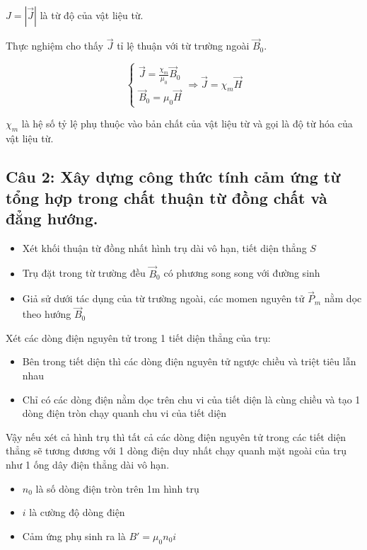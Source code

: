 $J = |\vec{J}|$ là từ độ của vật liệu từ.

Thực nghiệm cho thấy $\vec{J}$ tỉ lệ thuận với từ trường ngoài $\vec{B}_0$.

\begin{equation*}
  \begin{cases}
    \vec{J} = \frac{\chi_m}{\mu_0} \vec{B}_0 \\
    \vec{B}_0 = \mu_0 \vec{H}
  \end{cases}
  \Rightarrow \vec{J} = \chi_m \vec{H}
\end{equation*}

$\chi_m$ là hệ số tỷ lệ phụ thuộc vào bản chất của vật liệu từ và gọi là độ từ hóa của vật liệu từ.

\subsection[Câu 2]{Câu 2: Xây dựng công thức tính cảm ứng từ tổng hợp trong chất thuận từ đồng chất và đẳng hướng.}

\begin{itemize}
  \item Xét khối thuận từ đồng nhất hình trụ dài vô hạn, tiết diện thẳng $S$
  \item Trụ đặt trong từ trường đều $\vec{B}_0$ có phương song song với đường sinh
  \item Giả sử dưới tác dụng của từ trường ngoài, các momen nguyên tử $\vec{P}_m$ nằm dọc theo hướng $\vec{B}_0$
\end{itemize}

Xét các dòng điện nguyên tử trong 1 tiết diện thẳng của trụ:

\begin{itemize}
  \item Bên trong tiết diện thì các dòng điện nguyên tử ngược chiều và triệt tiêu lẫn nhau
  \item Chỉ có các dòng điện nằm dọc trên chu vi của tiết diện là cùng chiều và tạo 1 dòng điện tròn chạy quanh chu vi của tiết diện
\end{itemize}

Vậy nếu xét cả hình trụ thì tất cả các dòng điện nguyên tử trong các tiết diện thẳng sẽ tương đương với 1 dòng điện duy nhất chạy quanh mặt ngoài của trụ như 1 ống dây điện thẳng dài vô hạn.

\begin{itemize}
  \item $n_0$ là số dòng điện tròn trên 1m hình trụ
  \item $i$ là cường độ dòng điện
  \item Cảm ứng phụ sinh ra là $B' = \mu_0 n_0 i$
\end{itemize}


